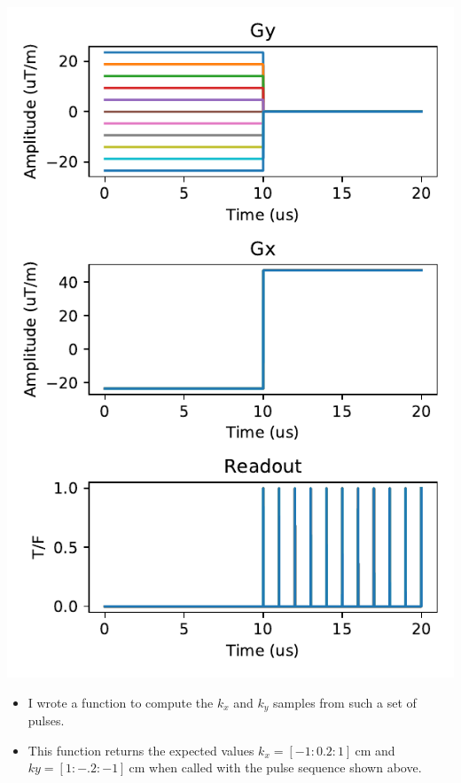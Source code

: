 \documentclass[dvipsnames]{beamer}
\begin{document}
\begin{frame}
\begin{center}
\includegraphics[height=\textheight]{kspace_pulses}
\end{center}
\end{frame}

\begin{frame}
\begin{itemize}
\item I wrote a function to compute the $k_x$ and $k_y$ samples from such a set of pulses.
\item This function returns the expected values $k_x = [-1:0.2:1]~\mathrm{cm}$ and $ky = [1:-.2:-1]~\mathrm{cm}$ when called with the pulse sequence shown above. 
\end{itemize}
\end{frame}
\end{document}
